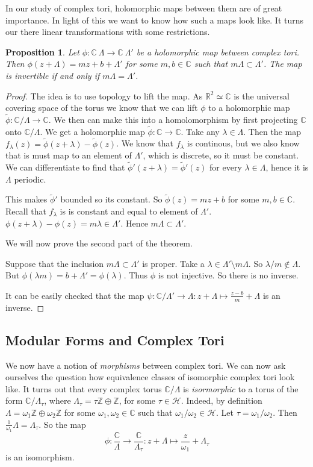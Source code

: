 \documentclass[a4paper]{article}
\theoremstyle{theoremdd}
\newtheorem{proposition}[theorem]{Proposition}
\theoremstyle{definitiondd}
\theoremstyle{remarkdd}
\newcommand{\Z}{\mathbb{Z}}
\newcommand{\C}{\mathbb{C}}
\newcommand{\R}{\mathbb{R}}
\newcommand{\ltr}{\par \noindent \framebox[1\width]{ $\implies$ } \hspace{.2cm}}
\newcommand{\rtl}{\par \noindent \framebox[1\width]{ $\impliedby$ } \hspace{.2cm} }
\begin{document}
In our study of complex tori, holomorphic maps between them are of great importance. 
In light of this we want to know how such a maps look like. It turns our there linear transformations with some restrictions. 
\begin{proposition}
	Let $\phi: \C \ \Lambda \to \C \ \Lambda'$ be a holomorphic map between complex tori. 
	Then $\phi(z + \Lambda) = mz + b + \Lambda'$ for some $m, b \in \C$ such that $m \Lambda \subset  \Lambda'$. 
	The map is invertible if and only if $m \Lambda = \Lambda'$.
\end{proposition}
\begin{proof}
	The idea is to use topology to lift the map. As $\R^2 \simeq \C$ is the universal covering space of the torus we know that we can lift $\phi$ to a holomorphic map $\tilde \phi: \C / \Lambda \to \C$. We then can make this into a homolomorphism by first projecting $\C$ onto $\C / \Lambda$. We get a holomorphic map  $\tilde \phi: \C \to \C$.
	Take any $\lambda \in \Lambda$. 
	Then the map $f_\lambda(z) = \tilde\phi(z + \lambda) - \tilde \phi(z)$. We know that $f_{\lambda}$ is continous, but we also know that is must map to an element of $\Lambda'$, which is discrete, so it must be constant. 
	We can differentiate to find that $\tilde\phi'(z+ \lambda) = \tilde\phi'(z)$ for every $\lambda \in \Lambda$, hence it is  $\Lambda$ periodic. 

	This makes $\tilde\phi'$ bounded so its constant. 
	So $\tilde \phi(z) = mz + b$ for some $m, b \in \C$. 
	Recall that $f_{\lambda}$ is is constant and equal to element of $\Lambda'$. 
	$\phi(z+\lambda) - \phi(z) = m\lambda \in \Lambda'$. 
	Hence $m \Lambda \subset \Lambda'$.

	We will now prove the second part of the theorem.
	\ltr Suppose that the inclusion  $m\Lambda \subset \Lambda'$ is proper. 
	Take a $\lambda \in \Lambda' \setminus m\Lambda$. 
	So $\lambda / m \not\in  \Lambda$. But $\phi(\lambda m) = b + \Lambda' = \phi(\lambda)$. Thus $\phi$ is not injective. So there is no inverse.
	\rtl It can be easily checked that the map $\psi: \C / \Lambda' \to \Lambda: z + \Lambda \mapsto  \frac{z-b}{m} + \Lambda$ is an inverse. 
\end{proof}

\subsection{Modular Forms and Complex Tori} \label{sec:modular_forms_and_complex_tori}
We now have a notion of \emph{morphisms} between complex tori. We can now ask ourselves the question how equivalence classes of isomorphic complex tori look like.
It turns out that every complex torus $\C / \Lambda$ is \emph{isormorphic} to a torus of the form $\C / \Lambda_\tau$, where $\Lambda_\tau = \tau \Z \oplus \Z$, for some $\tau \in  \mathcal{H}$. 
Indeed, by definition $\Lambda = \omega_1 \Z \oplus \omega_2 \Z$ for some $\omega_1, \omega_2 \in \C$ such that $\omega_1 / \omega_2 \in \mathcal{H} $. Let $\tau = \omega_1 / \omega_2$. 
Then $\frac{1}{\omega_1} \Lambda = \Lambda_\tau$. 
So the map  \[
\phi: \frac{\C}{ \Lambda} \to \frac{\C}{\Lambda_\tau}: z + \Lambda \mapsto \frac{z}{\omega_1} + \Lambda_\tau
\]
is an isomorphism.
\end{document}
